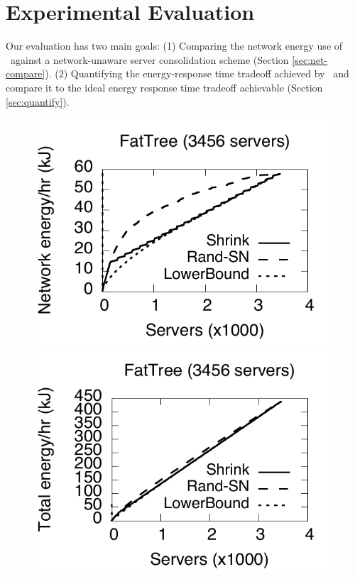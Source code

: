 \section{Experimental Evaluation}
\label{sec:eval}
\newcommand{\peakS}{Peak-S}
\newcommand{\peakSN}{Peak-SN}
\newcommand{\randSN}{Rand-SN}

Our evaluation has two main goals: (1) Comparing the network energy use of \shrink\ against a network-unaware server consolidation scheme (Section \ref{sec:net-compare}). (2) Quantifying the energy-response time tradeoff achieved by \shrink\ and compare it to the ideal energy response time tradeoff achievable (Section \ref{sec:quantify}).

\begin{figure}[t]
        \includegraphics[scale=0.4]{graphs/final/fattree-24.pdf}
                \includegraphics[scale=0.4]{graphs/final/fattree-24-total.pdf}

\end{figure}
